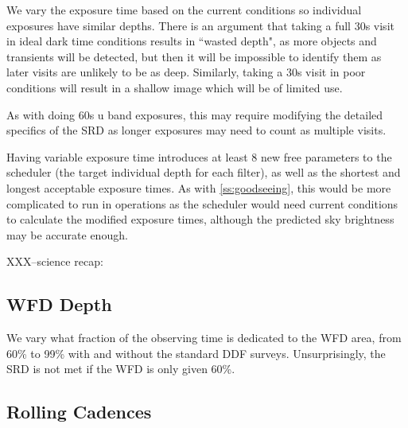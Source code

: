 We vary the exposure time based on the current conditions so individual exposures have similar depths. There is an argument that taking a full 30s visit in ideal dark time conditions results in ``wasted depth", as more objects and transients will be detected, but then it will be impossible to identify them as later visits are unlikely to be as deep. Similarly, taking a 30s visit in poor conditions will result in a shallow image which will be of limited use.

As with doing 60s u band exposures, this may require modifying the detailed specifics of the SRD as longer exposures may need to count as multiple visits.

Having variable exposure time introduces at least 8 new free parameters to the scheduler (the target individual depth for each filter), as well as the shortest and longest acceptable exposure times.  As with \ref{ss:goodseeing}, this would be more complicated to run in operations as the scheduler would need current conditions to calculate the modified exposure times, although the predicted sky brightness may be accurate enough.

XXX--science recap:


\subsection{WFD Depth}

We vary what fraction of the observing time is dedicated to the WFD area, from 60\% to 99\% with and without the standard DDF surveys. Unsurprisingly, the SRD is not met if the WFD is only given 60\%.


\subsection{Rolling Cadences}

